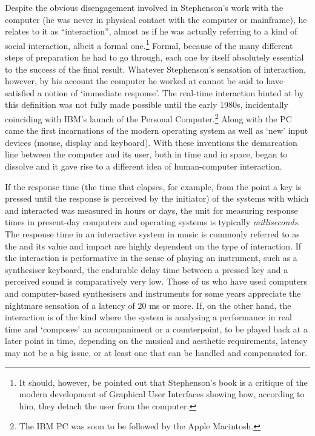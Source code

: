 Despite the obvious disengagement involved in Stephenson's work with the computer (he was never in physical contact with the computer or mainframe), he relates to it as ``interaction'', almost as if he was actually referring to a kind of social interaction, albeit a formal one.\footnote{It should, however, be pointed out that Stephenson's book \emph{} is a critique of the modern development of Graphical User Interfaces showing how, according to him,  they detach the user from the computer.} Formal, because of the many different steps of preparation he had to go through, each one by itself absolutely essential to the success of the final result. Whatever Stephenson's sensation of interaction, however, by his account the computer he worked at cannot be said to have satisfied a notion of `immediate response'. The real-time interaction hinted at by this definition was not fully made possible until the early 1980s, incidentally coinciding with IBM's launch of the Personal Computer.\footnote{The IBM PC was soon to be followed by the Apple Macintosh.} Along with the PC came the first incarnations of the modern operating system as well as `new' input devices (mouse, display and keyboard). With these inventions the demarcation line between the computer and its user, both in time and in space, began to dissolve and it gave rise to a different idea of human-computer interaction.

If the response time (the time that elapses, for example, from the point a key is pressed until the response is perceived by the initiator) of the systems with which \citeauthor{stephenson99} and \citeauthor{chowning07} interacted was measured in hours or days, the unit for measuring response times in present-day computers and operating systems is typically \emph{milliseconds}. The response time in an interactive system in music is commonly referred to as the  and its value and impact are highly dependent on the type of interaction. If the interaction is performative in the sense of playing an instrument, such as a synthesiser keyboard, the endurable delay time between a pressed key and a perceived sound is comparatively very low. Those of us who have used computers and computer-based synthesisers and instruments for some years appreciate the nightmare sensation of a latency of 20 ms or more. If, on the other hand, the interaction is of the kind where the system is analysing a performance in real time and `composes' an accompaniment or a counterpoint, to be played back at a later point in time, depending on the musical and aesthetic requirements, latency may not be a big issue, or at least one that can be handled and compensated for.

